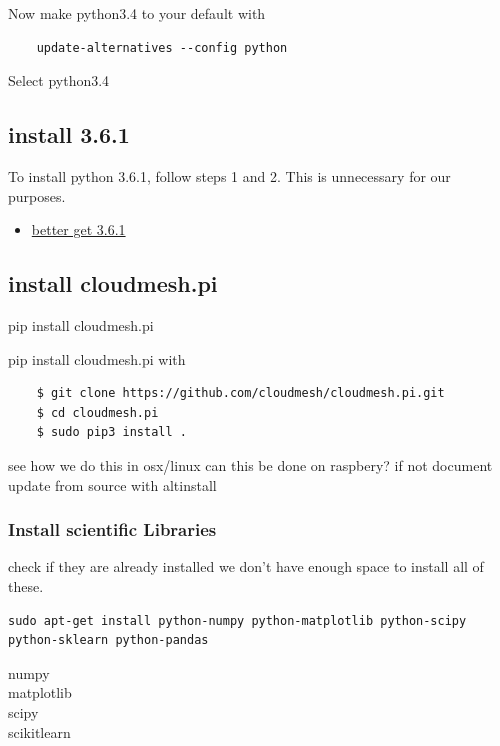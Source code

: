 Now make python3.4 to your default with

\begin{verbatim}
    update-alternatives --config python
\end{verbatim}

Select python3.4

\subsection{install 3.6.1}\label{install-3.6.1}

To install python 3.6.1, follow steps 1 and 2. This is unnecessary for
our purposes.

\begin{itemize}
\tightlist
\item
  \href{https://gist.github.com/dschep/24aa61672a2092246eaca2824400d37f}{better
  get 3.6.1}
\end{itemize}

\subsection{install cloudmesh.pi}\label{install-cloudmesh.pi}

pip install cloudmesh.pi

pip install cloudmesh.pi with

\begin{verbatim}
    $ git clone https://github.com/cloudmesh/cloudmesh.pi.git
    $ cd cloudmesh.pi
    $ sudo pip3 install .
\end{verbatim}

see how we do this in osx/linux can this be done on raspbery? if not
document update from source with altinstall

\subsubsection{Install scientific
Libraries}\label{install-scientific-libraries}

check if they are already installed we don't have enough space to
install all of these.

\begin{verbatim}
sudo apt-get install python-numpy python-matplotlib python-scipy python-sklearn python-pandas
\end{verbatim}

numpy\\
matplotlib\\
scipy\\
scikitlearn

